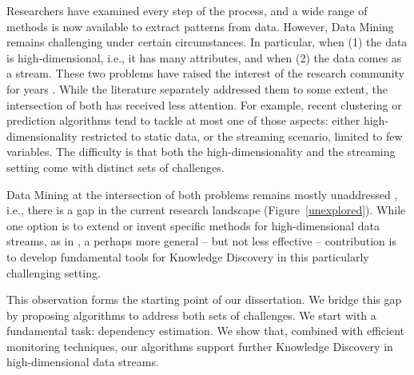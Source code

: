 Researchers have examined every step of the process, and a wide range of methods is now available to extract patterns from data. 
However, Data Mining remains challenging under certain circumstances. In particular, when (1) the data is high-dimensional, i.e., it has many attributes, and when (2) the data comes as a stream. These two problems have raised the interest of the research community for years \cite{DBLP:journals/sadm/ZimekSK12,DBLP:books/sp/Aggarwal2013,DBLP:journals/ijon/Ramirez-Gallego17,DBLP:journals/pai/Gama12}. While the literature separately addressed them to some extent, the intersection of both has received less attention. For example, recent clustering  \cite{DBLP:journals/csur/SilvaFBHCG13,DBLP:books/daglib/0030859,DBLP:journals/jcst/AminiTS14,DBLP:journals/ijon/WuLH12} or prediction  \cite{DBLP:conf/ijcai/TanTL11,DBLP:conf/aaai/WangRNBMX17,DBLP:journals/sadm/ZimekSK12,DBLP:conf/dasfaa/AssentKBS12,DBLP:conf/icdm/SatheA16,DBLP:conf/sdm/ChenSAT17} algorithms tend to tackle at most one of those aspects: either high-dimensionality restricted to static data, or the streaming scenario, limited to few variables. 
The difficulty is that both the high-dimensionality and the streaming setting come with distinct sets of challenges. 

Data Mining at the intersection of both problems remains mostly unaddressed \cite{DBLP:journals/sigkdd/SalehiR18}, i.e., there is a gap in the current research landscape (Figure~\ref{unexplored}). While one option is to extend or invent specific methods for high-dimensional data streams, as in \cite{DBLP:conf/icde/ZhangGW08, DBLP:conf/sdm/NtoutsiZPKK12}%
, a perhaps more general -- but not less effective -- contribution is to develop fundamental tools for Knowledge Discovery in this particularly challenging setting. 

This observation forms the starting point of our dissertation. We bridge this gap by proposing algorithms to address both sets of challenges. We start with a fundamental task: dependency estimation. We show that, combined with efficient monitoring techniques, our algorithms support further Knowledge Discovery in high-dimensional data streams.

